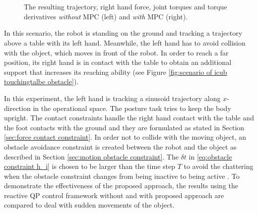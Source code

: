 \begin{figure}[!t]
\centering
{} \quad
{} \\
 \quad
{} \\
 \quad
{} 
\caption{The resulting trajectory, right hand force, joint torques and torque derivatives \textit{without} MPC (left) and \textit{with} MPC (right).}
\label{fig:icub results}
\end{figure}

In this scenario, the robot is standing on the ground and tracking a trajectory above a table with its left hand. Meanwhile, the left hand has to avoid collision with the object, which moves in front of the robot. In order to reach a far position, its right hand is in contact with the table to obtain an additional support that increases its reaching ability (see Figure \ref{fig:scenario of icub touchingtalbe obstacle}). 



In this experiment, the left hand is tracking a sinusoid trajectory along $x$-direction in the operational space. The posture task tries to keep the body upright. The contact constraints handle the right hand contact with the table and the foot contacts with the ground and they are formulated as stated in Section \ref{sec:force contact constraint}. In order not to collide with the moving object, an obstacle avoidance constraint is created between the robot and the object as described in Section \ref{sec:motion obstacle constraint}. The $\delta t$ in \eqref{eq:obstacle constraint h_i} is chosen to be larger than the time step $T$ to avoid the chattering when the obstacle constraint changes from being inactive to being active \cite{park1998, salini2012}. To demonstrate the effectiveness of the proposed approach, the results using the reactive QP control framework without and with proposed approach are compared to deal with sudden movements of the object. 


